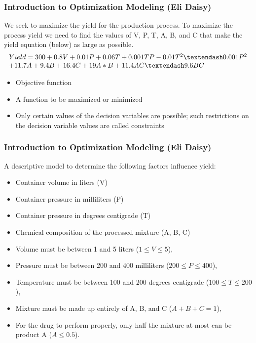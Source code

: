 \documentclass[11pt]{beamer}
\begin{document}
\begin{frame}
\frametitle{Introduction to Optimization Modeling (Eli Daisy)}

We seek to maximize the yield for the production process. To maximize the process yield we need to find the values of V, P, T, A, B, and C that make the yield equation (below) as large as possible.
\begin{equation}
  \begin{array}{l}
Yield = 300 + 0.8V +0.01P + 0.06T + 0.001TP - 0.01T^2 – 0.001P^2 \notag\\
+ 11.7A + 9.4B + 16.4C + 19A*B + 11.4AC – 9.6BC
\end{array}
\end{equation}
\pause

\begin{itemize}
\item Objective function
\item A function to be maximized or minimized
\item Only certain values of the decision variables are possible; such restrictions on the decision variable values are called constraints
\end{itemize}
\end{frame}
\begin{frame}
\frametitle{Introduction to Optimization Modeling (Eli Daisy)}
A descriptive model to determine the following factors influence yield:
\begin{itemize}
\item Container volume in liters (V)
\item Container pressure in milliliters (P)
\item Container pressure in degrees centigrade (T)
\item Chemical composition of the processed mixture (A, B, C)
\end{itemize}
\pause
\begin{itemize}
\item Volume must be between 1 and 5 liters ($1 \leq V \leq 5$),
\item Pressure must be between 200 and 400 milliliters ($200 \leq P \leq 400$),
\item Temperature must be between 100 and 200 degrees centigrade ($100 \leq T \leq 200$),
\item Mixture must be made up entirely of A, B, and C ($A+B+C = 1$),
\item For the drug to perform properly, only  half the mixture at most can be product A ($A \leq 0.5$).
\end{itemize}
\end{frame}
\end{document}
